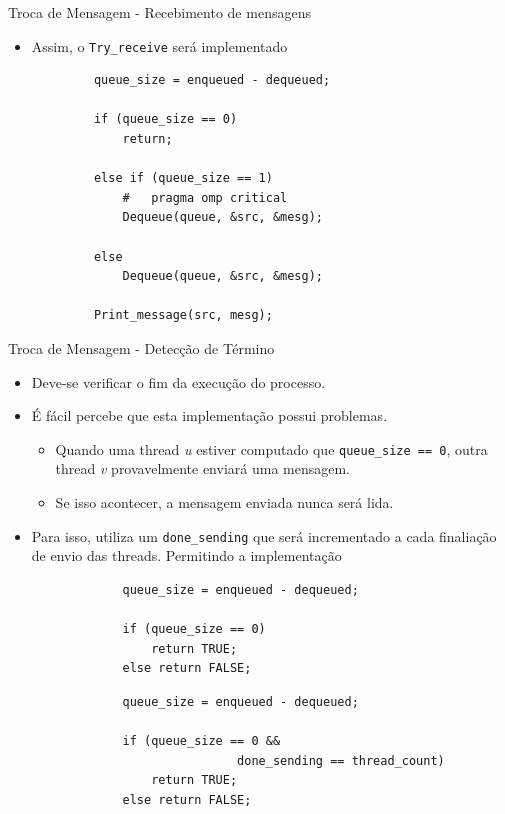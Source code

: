 	\begin{frame}[fragile]{Troca de Mensagem -  Recebimento de mensagens}
		\begin{itemize}
			\item Assim, o {\tt Try\_receive} será implementado
		\end{itemize}
		\begin{verbatim}
			queue_size = enqueued - dequeued;

			if (queue_size == 0) 
				return;

			else if (queue_size == 1)
				#	pragma omp critical
				Dequeue(queue, &src, &mesg);

			else
				Dequeue(queue, &src, &mesg);

			Print_message(src, mesg);
		\end{verbatim}
\end{frame}

	\begin{frame}[fragile]{Troca de Mensagem -  Detecção de Término}
		\begin{itemize}
			\item Deve-se verificar o fim da execução do processo.
		\end{itemize}


		\begin{multicols}{2}
			\begin{itemize}
				\item É fácil percebe que esta implementação possui problemas.
				\begin{itemize}
					\item Quando uma thread \textit{u} estiver computado que {\tt queue\_size == 0}, outra thread \textit{v} provavelmente enviará uma mensagem.
					\item Se isso acontecer, a mensagem enviada nunca será lida.
				\end{itemize}
				\item Para isso, utiliza um {\tt done\_sending} que será incrementado a cada finaliação de envio das threads. Permitindo a implementação
			\end{itemize}
		\columnbreak
			\begin{verbatim}
				queue_size = enqueued - dequeued; 

				if (queue_size == 0)
					return TRUE; 
				else return FALSE;
			\end{verbatim}
					\pause
			\begin{verbatim}
				queue_size = enqueued - dequeued; 

				if (queue_size == 0 && 
								done_sending == thread_count)
					return TRUE; 
				else return FALSE;
			\end{verbatim}
		\end{multicols}
\end{frame}



